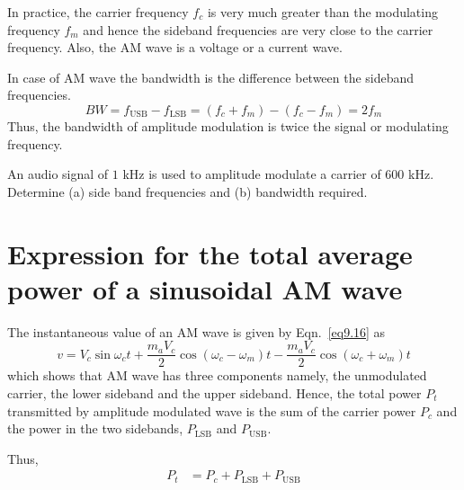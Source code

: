 In practice, the carrier frequency $f_{c}$ is very much greater than the modulating frequency $f_{m}$ and hence the sideband frequencies are very close to the carrier frequency. Also, the AM wave is a voltage or a current wave.

In case of AM wave the bandwidth is the difference between the sideband frequencies.
\begin{equation}
BW=f_{\text{USB}}-f_{\text{LSB}}=(f_{c}+f_{m})-(f_{c}-f_{m})=2f_{m}\label{eq9.23}
\end{equation}
Thus, the bandwidth of amplitude modulation is twice the signal or modulating frequency.

\begin{example}\label{exam9.1}
An audio signal of $1$ kHz is used to amplitude modulate a carrier of $600$ kHz. Determine (a) side band frequencies and (b) bandwidth required.
\end{example}


\eject

\section{Expression for the total average power of a sinusoidal AM wave}\label{sec9.11}

The instantaneous value of an AM wave is given by Eqn.~\eqref{eq9.16} as
$$
v=V_{c}\sin \omega_{c}t+\dfrac{m_{a}V_{c}}{2}\cos (\omega_{c}-\omega_{m})t-\dfrac{m_{a}V_{c}}{2}\cos (\omega_{c}+\omega_{m})t
$$
which shows that AM wave has three components namely, the unmodulated carrier, the lower sideband and the upper sideband. Hence, the total power $P_{t}$ transmitted by amplitude modulated wave is the sum of the carrier power $P_{c}$ and the power in the two sidebands, $P_{\text{LSB}}$ and $P_{\text{USB}}$.

Thus,
\begin{align*}
P_{t} &= P_{c}+P_{\text{LSB}}+P_{\text{USB}}
\end{align*}

